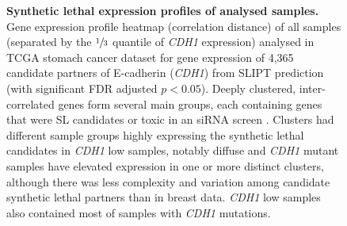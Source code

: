 \begin{figure}[!ht]
\begin{mdframed}
  \centering
    \caption[Synthetic lethal expression profiles of stomach samples]{\small \textbf{Synthetic lethal expression profiles of analysed samples.} Gene expression profile heatmap (correlation distance) of all samples (separated by the $\sfrac{1}{3}$ quantile of \textit{CDH1} expression) analysed in TCGA stomach cancer dataset for gene expression of 4,365 candidate partners of E-cadherin (\textit{CDH1}) from \gls{SLIPT} prediction (with significant FDR adjusted $p < 0.05$). Deeply clustered, inter-correlated genes form several main groups, each containing genes that were SL candidates or toxic in an siRNA screen \cite{Telford2015}. Clusters had different sample groups highly expressing the synthetic lethal candidates in \textit{CDH1} low samples, notably diffuse and \textit{CDH1} mutant samples have elevated expression in one or more distinct clusters, although there was less complexity and variation among candidate synthetic lethal partners than in breast data. \textit{CDH1} low samples also contained most of samples with \textit{CDH1} mutations.
}
\label{fig:slipt_expr_stad}
\end{mdframed}
\end{figure}

